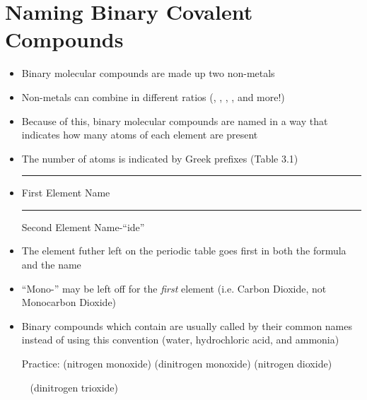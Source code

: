 \documentclass[12pt, openany, letterpaper]{memoir}
\begin{document}
\section{Naming Binary Covalent Compounds}
\begin{itemize}
	\item Binary molecular compounds are made up two non-metals
	\item Non-metals can combine in different ratios (, , , , and more!)
	\item Because of this, binary molecular compounds are named in a way that indicates how many atoms of each element are present
	\item The number of atoms is indicated by Greek prefixes (Table 3.1)
	\item \rule[-1mm]{1in}{.1pt} First Element Name \rule[-1mm]{1in}{.1pt} Second Element Name-``ide''
	\item The element futher left on the periodic table goes first in both the formula and the name
	\item ``Mono-'' may be left off for the \emph{first} element (i.e. Carbon Dioxide, not Monocarbon Dioxide)
	\item Binary compounds which contain  are usually called by their common names instead of using this convention (water, hydrochloric acid, and ammonia)
	
	Practice:  (nitrogen monoxide)  \hspace{1em}  (dinitrogen monoxide)  \hspace{1em}  (nitrogen dioxide) 
	
	~\hphantom{Practice:}  (dinitrogen trioxide)
\end{itemize}
\end{document}
